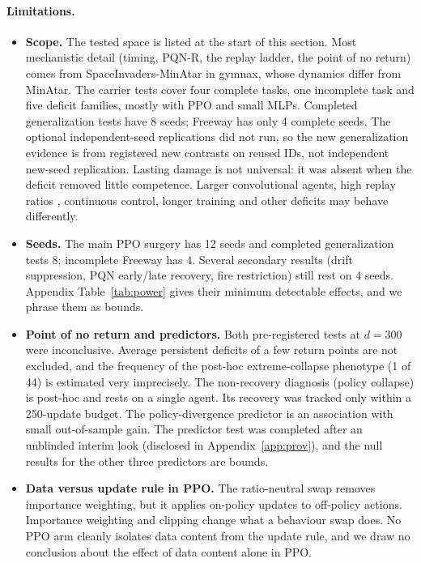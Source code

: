 \documentclass[10pt]{article} %
\begin{document}
\paragraph{Limitations.}\label{sec:limits}
\begin{itemize}
\item \textbf{Scope.} The tested space is listed at the start of this section. Most mechanistic detail (timing, PQN-R, the replay ladder, the point of no return) comes from SpaceInvaders-MinAtar in gymnax, whose dynamics differ from MinAtar. The carrier tests cover four complete tasks, one incomplete task and five deficit families, mostly with PPO and small MLPs. Completed generalization tests have 8 seeds; Freeway has only 4 complete seeds. The optional independent-seed replications did not run, so the new generalization evidence is from registered new contrasts on reused IDs, not independent new-seed replication. Lasting damage is not universal: it was absent when the deficit removed little competence. Larger convolutional agents, high replay ratios \citep{schwarzer2023bbf}, continuous control, longer training and other deficits may behave differently.
\item \textbf{Seeds.} The main PPO surgery has 12 seeds and completed generalization tests 8; incomplete Freeway has 4. Several secondary results (drift suppression, PQN early/late recovery, fire restriction) still rest on 4 seeds. Appendix Table~\ref{tab:power} gives their minimum detectable effects, and we phrase them as bounds.
\item \textbf{Point of no return and predictors.} Both pre-registered tests at $d=300$ were inconclusive. Average persistent deficits of a few return points are not excluded, and the frequency of the post-hoc extreme-collapse phenotype (1 of 44) is estimated very imprecisely. The non-recovery diagnosis (policy collapse) is post-hoc and rests on a single agent. Its recovery was tracked only within a 250-update budget. The policy-divergence predictor is an association with small out-of-sample gain. The predictor test was completed after an unblinded interim look (disclosed in Appendix~\ref{app:prov}), and the null results for the other three predictors are bounds.
\item \textbf{Data versus update rule in PPO.} The ratio-neutral swap removes importance weighting, but it applies on-policy updates to off-policy actions. Importance weighting and clipping change what a behaviour swap does. No PPO arm cleanly isolates data content from the update rule, and we draw no conclusion about the effect of data content alone in PPO.

\end{itemize}
\end{document}
